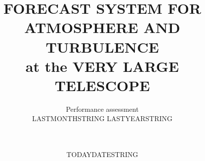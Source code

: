 \documentclass[a4paper]{article}
\title{FORECAST SYSTEM FOR ATMOSPHERE AND TURBULENCE\\
at the VERY LARGE TELESCOPE}
\author{
\vspace{1.0cm}
\begin{minipage}{9.5cm}
\begin{center}
\LARGE{Performance assessment}\\
\LARGE{LASTMONTHSTRING LASTYEARSTRING}\\
\end{center}
\end{minipage}\\
\vspace{3cm}
}
\date{TODAYDATESTRING}
\begin{document}
 
\maketitle 


\contents     %


%































%




%
%
%
%
%


\end{document}
